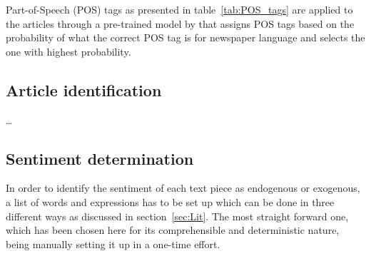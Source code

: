 
Part-of-Speech (POS) tags as presented in table~\vref{tab:POS_tags} are applied to the articles through a pre-trained model by \textcite{OpenNLP.2016} that assigns POS tags based on the probability of what the correct POS tag is for newspaper language and selects the one with highest probability.


\subsection{Article identification}

\dots 

\subsection{Sentiment determination}

In order to identify the sentiment of each text piece as endogenous or exogenous, a list of words and expressions has to be set up which can be done in three different ways as discussed in section~\ref{sec:Lit}. The most straight forward one, which has been chosen here for its comprehensible and deterministic nature, being manually setting it up in a one-time effort. 





